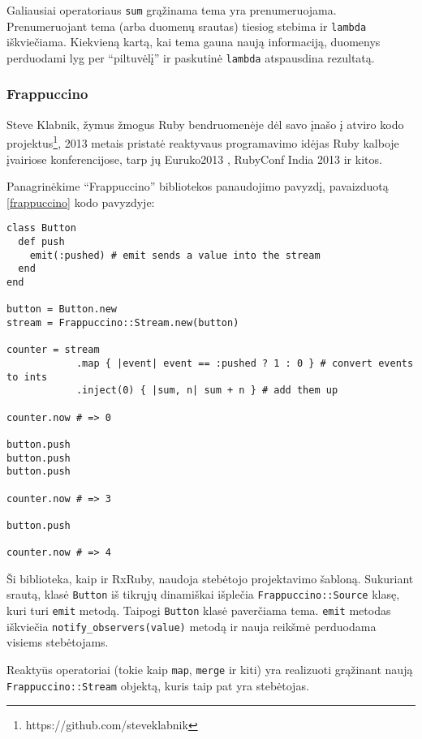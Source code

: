 Galiausiai operatoriaus \lstinline|sum| grąžinama tema yra prenumeruojama. Prenumeruojant tema (arba duomenų srautas) tiesiog stebima ir \lstinline|lambda| iškviečiama. Kiekvieną kartą, kai tema gauna naują informaciją, duomenys perduodami lyg per ``piltuvėlį'' ir paskutinė \lstinline|lambda| atspausdina rezultatą.

\subsubsection{Frappuccino}

Steve Klabnik, žymus žmogus Ruby bendruomenėje dėl savo įnašo į atviro kodo projektus\footnote{https://github.com/steveklabnik}, 2013 metais pristatė reaktyvaus programavimo idėjas Ruby kalboje įvairiose konferencijose, tarp jų Euruko2013 \cite{klabnik:euruko}, RubyConf India 2013 \cite{klabnik:india} ir kitos.

Panagrinėkime ``Frappuccino'' bibliotekos panaudojimo pavyzdį, pavaizduotą \ref{frappuccino} kodo pavyzdyje:

\begin{lstlisting}[caption=``Frappuccino'' bibliotekos panaudojimo pavyzdys, label=frappuccino]
class Button
  def push
    emit(:pushed) # emit sends a value into the stream
  end
end

button = Button.new
stream = Frappuccino::Stream.new(button)

counter = stream
            .map { |event| event == :pushed ? 1 : 0 } # convert events to ints
            .inject(0) { |sum, n| sum + n } # add them up

counter.now # => 0

button.push
button.push
button.push

counter.now # => 3

button.push

counter.now # => 4
\end{lstlisting}

Ši biblioteka, kaip ir RxRuby, naudoja stebėtojo projektavimo šabloną. Sukuriant srautą, klasė \lstinline|Button| iš tikrųjų dinamiškai išplečia \lstinline|Frappuccino::Source| klasę, kuri turi \lstinline|emit| metodą. Taipogi \lstinline|Button| klasė paverčiama tema. \lstinline|emit| metodas iškviečia \lstinline|notify_observers(value)| metodą ir nauja reikšmė perduodama visiems stebėtojams.

Reaktyūs operatoriai (tokie kaip \lstinline|map|, \lstinline|merge| ir kiti) yra realizuoti grąžinant naują \lstinline|Frappuccino::Stream| objektą, kuris taip pat yra stebėtojas.

